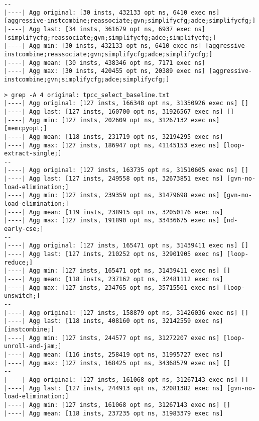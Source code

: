 \documentclass{vldb}
\newcommand{\dbCode}[1]{{\sffamily\small \textbf{#1}}\xspace}
\begin{document}
\begin{lstlisting}[caption={Results of Query \dbCode{INSERT INTO foo VALUES (1)} with Expert Optimizations},label={lst:simpleexpertopt}]
--
|----| Agg original: [30 insts, 432133 opt ns, 6410 exec ns] [aggressive-instcombine;reassociate;gvn;simplifycfg;adce;simplifycfg;]
|----| Agg last: [34 insts, 361679 opt ns, 6937 exec ns] [simplifycfg;reassociate;gvn;simplifycfg;adce;simplifycfg;]
|----| Agg min: [30 insts, 432133 opt ns, 6410 exec ns] [aggressive-instcombine;reassociate;gvn;simplifycfg;adce;simplifycfg;]
|----| Agg mean: [30 insts, 438346 opt ns, 7171 exec ns]
|----| Agg max: [30 insts, 420455 opt ns, 20389 exec ns] [aggressive-instcombine;gvn;simplifycfg;adce;simplifycfg;]
\end{lstlisting}

\clearpage

\begin{lstlisting}[caption={Results of TPC-C Query with No Optimizations},label={lst:tpccnoopt}]
> grep -A 4 original: tpcc_select_baseline.txt 
|----| Agg original: [127 insts, 166348 opt ns, 31350926 exec ns] []
|----| Agg last: [127 insts, 160700 opt ns, 31926567 exec ns] []
|----| Agg min: [127 insts, 202609 opt ns, 31267132 exec ns] [memcpyopt;]
|----| Agg mean: [118 insts, 231719 opt ns, 32194295 exec ns]
|----| Agg max: [127 insts, 186947 opt ns, 41145153 exec ns] [loop-extract-single;]
--
|----| Agg original: [127 insts, 163735 opt ns, 31510605 exec ns] []
|----| Agg last: [127 insts, 249558 opt ns, 32673851 exec ns] [gvn-no-load-elimination;]
|----| Agg min: [127 insts, 239359 opt ns, 31479698 exec ns] [gvn-no-load-elimination;]
|----| Agg mean: [119 insts, 238915 opt ns, 32050176 exec ns]
|----| Agg max: [127 insts, 191890 opt ns, 33436675 exec ns] [nd-early-cse;]
--
|----| Agg original: [127 insts, 165471 opt ns, 31439411 exec ns] []
|----| Agg last: [127 insts, 210252 opt ns, 32901905 exec ns] [loop-reduce;]
|----| Agg min: [127 insts, 165471 opt ns, 31439411 exec ns] []
|----| Agg mean: [118 insts, 237162 opt ns, 32481112 exec ns]
|----| Agg max: [127 insts, 234765 opt ns, 35715501 exec ns] [loop-unswitch;]
--
|----| Agg original: [127 insts, 158879 opt ns, 31426036 exec ns] []
|----| Agg last: [118 insts, 408160 opt ns, 32142559 exec ns] [instcombine;]
|----| Agg min: [127 insts, 244577 opt ns, 31272207 exec ns] [loop-unroll-and-jam;]
|----| Agg mean: [116 insts, 258419 opt ns, 31995727 exec ns]
|----| Agg max: [127 insts, 168425 opt ns, 34368579 exec ns] []
--
|----| Agg original: [127 insts, 161068 opt ns, 31267143 exec ns] []
|----| Agg last: [127 insts, 244913 opt ns, 32081382 exec ns] [gvn-no-load-elimination;]
|----| Agg min: [127 insts, 161068 opt ns, 31267143 exec ns] []
|----| Agg mean: [118 insts, 237235 opt ns, 31983379 exec ns]

\end{lstlisting}
\end{document}
